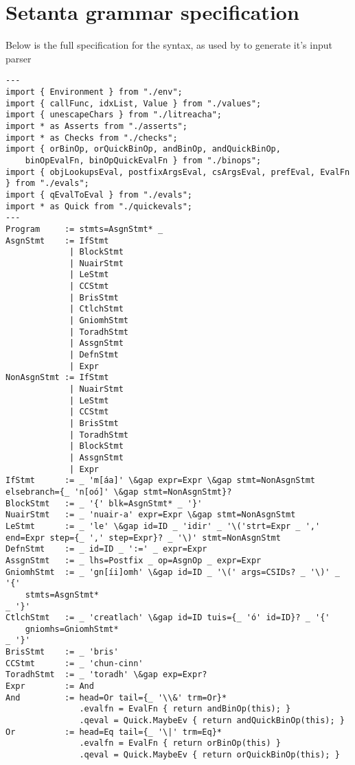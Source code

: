 \chapter{Setanta grammar specification}
\label{appendix:setantagrammar}

Below is the full specification for the \Setanta{} syntax, as used by \tsPEG{} to generate it's input parser
\begin{lstlisting}[language=tspeg, frame=single]
---
import { Environment } from "./env";
import { callFunc, idxList, Value } from "./values";
import { unescapeChars } from "./litreacha";
import * as Asserts from "./asserts";
import * as Checks from "./checks";
import { orBinOp, orQuickBinOp, andBinOp, andQuickBinOp,
    binOpEvalFn, binOpQuickEvalFn } from "./binops";
import { objLookupsEval, postfixArgsEval, csArgsEval, prefEval, EvalFn } from "./evals";
import { qEvalToEval } from "./evals";
import * as Quick from "./quickevals";
---
Program     := stmts=AsgnStmt* _
AsgnStmt    := IfStmt
             | BlockStmt
             | NuairStmt
             | LeStmt
             | CCStmt
             | BrisStmt
             | CtlchStmt
             | GniomhStmt
             | ToradhStmt
             | AssgnStmt
             | DefnStmt
             | Expr
NonAsgnStmt := IfStmt
             | NuairStmt
             | LeStmt
             | CCStmt
             | BrisStmt
             | ToradhStmt
             | BlockStmt
             | AssgnStmt
             | Expr
IfStmt      := _ 'm[áa]' \&gap expr=Expr \&gap stmt=NonAsgnStmt elsebranch={_ 'n[oó]' \&gap stmt=NonAsgnStmt}?
BlockStmt   := _ '{' blk=AsgnStmt* _ '}'
NuairStmt   := _ 'nuair-a' expr=Expr \&gap stmt=NonAsgnStmt
LeStmt      := _ 'le' \&gap id=ID _ 'idir' _ '\('strt=Expr _ ',' end=Expr step={_ ',' step=Expr}? _ '\)' stmt=NonAsgnStmt
DefnStmt    := _ id=ID _ ':=' _ expr=Expr
AssgnStmt   := _ lhs=Postfix _ op=AsgnOp _ expr=Expr
GniomhStmt  := _ 'gn[íi]omh' \&gap id=ID _ '\(' args=CSIDs? _ '\)' _ '{'
    stmts=AsgnStmt*
_ '}'
CtlchStmt   := _ 'creatlach' \&gap id=ID tuis={_ 'ó' id=ID}? _ '{'
    gniomhs=GniomhStmt*
_ '}'
BrisStmt    := _ 'bris'
CCStmt      := _ 'chun-cinn'
ToradhStmt  := _ 'toradh' \&gap exp=Expr?
Expr        := And
And         := head=Or tail={_ '\\&' trm=Or}*
               .evalfn = EvalFn { return andBinOp(this); }
               .qeval = Quick.MaybeEv { return andQuickBinOp(this); }
Or          := head=Eq tail={_ '\|' trm=Eq}*
               .evalfn = EvalFn { return orBinOp(this) }
               .qeval = Quick.MaybeEv { return orQuickBinOp(this); }

\end{lstlisting}
